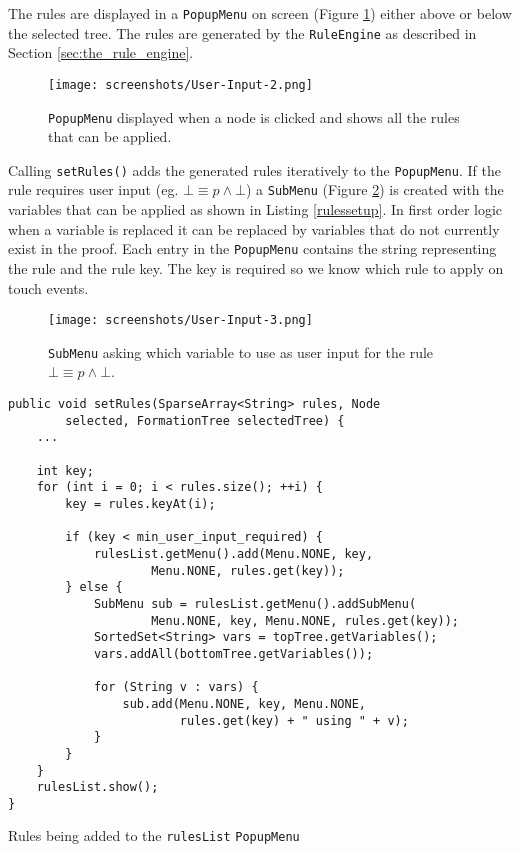 \documentclass{report}
\begin{document}
The rules are displayed in a {\tt PopupMenu} on screen (Figure \ref{userinput2}) either above or below the selected tree. The rules are generated by the {\tt RuleEngine} as described in Section \ref{sec:the_rule_engine}.

\begin{figure}[ht]
    \centering
    \texttt{[image: screenshots/User-Input-2.png]}
    \caption{{\tt PopupMenu} displayed when a node is clicked and shows all the rules that can be applied.}
    \label{userinput2}
\end{figure}

Calling {\tt setRules()} adds the generated rules iteratively to the {\tt PopupMenu}. If the rule requires user input (eg. $\bot \equiv p \land \bot$) a {\tt SubMenu} (Figure \ref{userinput3}) is created with the variables that can be applied as shown in Listing \ref{rulessetup}. In first order logic when a variable is replaced it can be replaced by variables that do not currently exist in the proof. Each entry in the {\tt PopupMenu} contains the string representing the rule and the rule key. The key is required so we know which rule to apply on touch events.

\begin{figure}[ht]
    \centering
    \texttt{[image: screenshots/User-Input-3.png]}
    \caption{{\tt SubMenu} asking which variable to use as user input for the rule $\bot \equiv p \land \bot$.}
    \label{userinput3}
\end{figure}

\begin{listing}[ht]
\begin{verbatim}
public void setRules(SparseArray<String> rules, Node 
        selected, FormationTree selectedTree) {
    ...

    int key;
    for (int i = 0; i < rules.size(); ++i) {
        key = rules.keyAt(i);

        if (key < min_user_input_required) {
            rulesList.getMenu().add(Menu.NONE, key, 
                    Menu.NONE, rules.get(key));
        } else {
            SubMenu sub = rulesList.getMenu().addSubMenu(
                    Menu.NONE, key, Menu.NONE, rules.get(key));
            SortedSet<String> vars = topTree.getVariables();
            vars.addAll(bottomTree.getVariables());

            for (String v : vars) {
                sub.add(Menu.NONE, key, Menu.NONE, 
                        rules.get(key) + " using " + v);
            }
        }
    }
    rulesList.show();
}
\end{verbatim}
\caption{Rules being added to the {\tt rulesList} {\tt PopupMenu}}
\label{rulessetup}
\end{listing}
\end{document}
